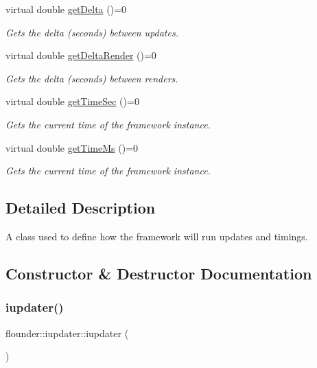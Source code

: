 \begin{DoxyCompactItemize}
virtual double \hyperlink{classflounder_1_1iupdater_a1e8d40602f9799fc82d96d5b845cf796}{get\+Delta} ()=0
\begin{DoxyCompactList}\small\item\em Gets the delta (seconds) between updates. \end{DoxyCompactList}\item 
virtual double \hyperlink{classflounder_1_1iupdater_a00d7cf530cfbd7f83c8903328da14027}{get\+Delta\+Render} ()=0
\begin{DoxyCompactList}\small\item\em Gets the delta (seconds) between renders. \end{DoxyCompactList}\item 
virtual double \hyperlink{classflounder_1_1iupdater_a071086b844e1f90d7f3577e80c9c09fe}{get\+Time\+Sec} ()=0
\begin{DoxyCompactList}\small\item\em Gets the current time of the framework instance. \end{DoxyCompactList}\item 
virtual double \hyperlink{classflounder_1_1iupdater_a56548faad88ad85e0cb4bc96af0912d6}{get\+Time\+Ms} ()=0
\begin{DoxyCompactList}\small\item\em Gets the current time of the framework instance. \end{DoxyCompactList}\end{DoxyCompactItemize}


\subsection{Detailed Description}
A class used to define how the framework will run updates and timings. 



\subsection{Constructor \& Destructor Documentation}
\mbox{\label{classflounder_1_1iupdater_acbbc1766a8c236ba89ff55eee9b25850}} 
\subsubsection{\texorpdfstring{iupdater()}{iupdater()}}
{\footnotesize\ttfamily flounder\+::iupdater\+::iupdater (\begin{DoxyParamCaption}{ }\end{DoxyParamCaption})\hspace{0.3cm}{\ttfamily [inline]}}



